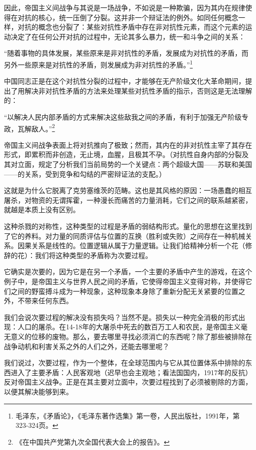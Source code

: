 \documentclass[fontset=fandol, a4paper, 12pt, twoside]{ctexart}
\renewenvironment{quote}
  {\list{}{\rightmargin=0cm \leftmargin=2em}%
   \item\relax\small\kaishu\color{black}}
  {\endlist}
\begin{document}
因此，帝国主义间战争与其说是一场战争，不如说是一种欺骗，因为其内在规律使得在对抗的核心，统一压倒了分裂。这并非一个辩证法的例外。如同任何概念一样，对抗的概念也分裂了：某些对抗性矛盾中存在非对抗性元素，而这个元素的运动决定了在任何公开对抗的过程中，无论其多么暴力，统一和斗争之间的关系：

\begin{quote}
“随着事物的具体发展，某些原来是非对抗性的矛盾，发展成为对抗性的矛盾，而另外一些原来是对抗性的矛盾，则发展成为非对抗性的矛盾。”\footnote{毛泽东，《矛盾论》，《毛泽东著作选集》第一卷，人民出版社，1991年，第323-324页。}
\end{quote}

中国同志正是在这个对抗性分裂的过程中，才能够在无产阶级文化大革命期间，提出了用解决非对抗性矛盾的方法来处理某些对抗性矛盾的指示，否则这是无法理解的：

\begin{quote}
“以解决人民内部矛盾的方式来解决这些敌我之间的矛盾，有利于加强无产阶级专政，瓦解敌人。”\footnote{《在中国共产党第九次全国代表大会上的报告》。}
\end{quote}

帝国主义间战争表面上将对抗推向了极致；然而，其内在的非对抗性主宰了其存在形式，即累积而非创造，无止境，血腥，且极其不孕。（对抗性自身内部的分裂及其对立面，规定了分析我们当前局势的一个关键点：两个超级大国——苏联和美国——的关系，受到竞争和勾结的严密辩证法的支配。）

这就是为什么它脱离了克劳塞维茨的范畴。这也是其风格的原因：一场愚蠢的相互屠杀，对物资的无谓挥霍，一种漫长而痛苦的力量消耗，它们之间的联系越紧密，就越是本质上没有区别。

这种杀戮的对称性，这种类型的过程是矛盾的弱结构形式。量化的思想在这里找到了它的养料。对力量的同质评估与位置的互换（胜利或失败）之间存在一种机械关系。因果关系是线性的。位置逻辑从属于力量逻辑。让我们给精神分析一个花（修辞的花）：我们将这种类型的矛盾称为次要过程。

它确实是次要的，因为它是在另一个矛盾，一个主要的矛盾中产生的游戏，在这个例子中，是帝国主义与世界人民之间的矛盾，它使得帝国主义变得对称，并使得它们之间的野蛮搏斗成为一种现象，这种现象本身除了重新分配无关紧要的位置之外，不带来任何东西。

我们会说次要过程的解决没有损失吗？当然不是。损失以一种完全消极的形式出现：人口的屠杀。在14-18年的大屠杀中死去的数百万工人和农民，是帝国主义毫无意义的位移的废物。那么，要去哪里寻找必须消亡的东西呢？除了那些被排除在战争动机和利害关系之外的人们之外，还能去哪里呢？

我们说过，次要过程，作为一个整体，在全球范围内与它从其位置体系中排除的东西进入了主要矛盾：人民客观地（迟早也会主观地；看法国国内，1917年的反抗）反对帝国主义战争。正是在其主要对立面中，次要过程找到了必须被剔除的方面，以便其解决能够到来。
\end{document}
